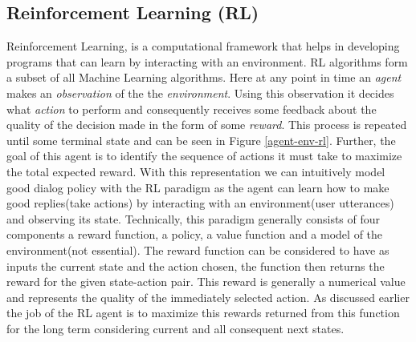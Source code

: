 \documentclass[12pt]{extarticle}
\numberwithin{equation}{section}
\begin{document}
	\subsection{Reinforcement Learning (RL)}
	Reinforcement Learning, is a computational framework that helps in developing programs that can learn by interacting with an environment. RL algorithms form a subset of all Machine Learning algorithms. Here at any point in time an \textit{agent} makes an \textit{observation} of the the \textit{environment}. Using this observation it decides what \textit{action} to perform and consequently receives some feedback about the quality of the decision made in the form of some \textit{reward}. This process is repeated until some terminal state and can be seen in Figure \ref{agent-env-rl}. Further, the goal of this agent is to identify the sequence of actions it must take to maximize the total expected reward. With this representation we can intuitively model good dialog policy with the RL paradigm as the agent can learn how to make good replies(take actions) by interacting with an environment(user utterances) and observing its state. Technically, this paradigm generally consists of four components a reward function, a policy, a value function and a model of the environment(not essential). The reward function can be considered to have as inputs the current state and the action chosen, the function then returns the reward for the given state-action pair. This reward is generally a numerical value and represents the quality of the immediately selected action. As discussed earlier the job of the RL agent is to maximize this rewards returned from this function for the long term considering current and all consequent next states.
	
\end{document}
